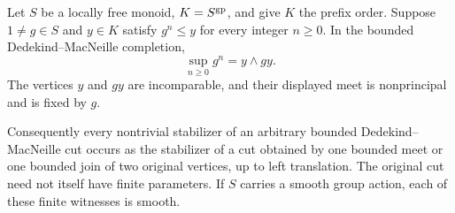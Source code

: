 \begin{lemma}
\label{G:bounded-power-cut}
Let $S$ be a locally free monoid, $K=S^{\mathrm{gp}}$, and give $K$
the prefix order. Suppose $1\ne g\in S$ and $y\in K$ satisfy
$g^n\le y$ for every integer $n\ge0$. In the bounded
Dedekind--MacNeille completion,
\[
 \sup_{n\ge0} g^n=y\wedge gy.
\]
The vertices $y$ and $gy$ are incomparable, and their displayed
meet is nonprincipal and is fixed by $g$.

Consequently every nontrivial stabilizer of an arbitrary bounded
Dedekind--MacNeille cut occurs as the stabilizer of a cut obtained
by one bounded meet or one bounded join of two original vertices,
up to left translation. The original cut need not itself have
finite parameters. If $S$ carries a smooth group action, each of
these finite witnesses is smooth.
\end{lemma}
